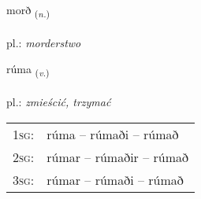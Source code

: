 \documentclass[frontgrid, backgrid]{flacards}\usepackage[]{graphicx}\usepackage[]{xcolor}
\begin{document}
\renewcommand{\flhead}{\vskip5pt \fboxsep=0pt {\small\bfseries\footnotesize Nafnorð | rzeczownik}}
\renewcommand{\fcfoot}{\vskip5pt \fboxsep=0pt \hspace{2pt}{\small\bfseries\footnotesize 3K}}

\renewcommand{\blhead}{\vskip5pt {\small\bfseries\footnotesize Nafnorð | rzeczownik }}
\renewcommand{\bcfoot}{\vskip5pt \hspace{2pt}{\small\bfseries\footnotesize 3K}}


{morð \small{\textsubscript{(\textit{n.})}} \\[1ex] %
\textphonetic{[mɔrð]} \\
pl.: \emph{morderstwo} \\  [2ex]
\renewcommand*{\arraystretch}{0.8}
}

\renewcommand{\flhead}{\vskip5pt \fboxsep=0pt {\small\bfseries\footnotesize Sagnorð | czasownik}}
\renewcommand{\fcfoot}{\vskip5pt \fboxsep=0pt \hspace{2pt}{\small\bfseries\footnotesize 3K}}

\renewcommand{\blhead}{\vskip5pt {\small\bfseries\footnotesize Sagnorð | czasownik }}
\renewcommand{\bcfoot}{\vskip5pt \hspace{2pt}{\small\bfseries\footnotesize 3K}}


{rúma \small{\textsubscript{(\textit{v.})}} \\[1ex] %
\textphonetic{[ruːma]} \\
pl.: \emph{zmieścić, trzymać} \\  [2ex]
\renewcommand*{\arraystretch}{0.8}
\begin{tabular}{p{1cm}l}
\textsc{1sg}: & rúma -- rúmaði -- rúmað \\ 
\textsc{2sg}: & rúmar -- rúmaðir -- rúmað \\ 
\textsc{3sg}: & rúmar -- rúmaði -- rúmað \\ 
\end{tabular}
}
\end{document}
